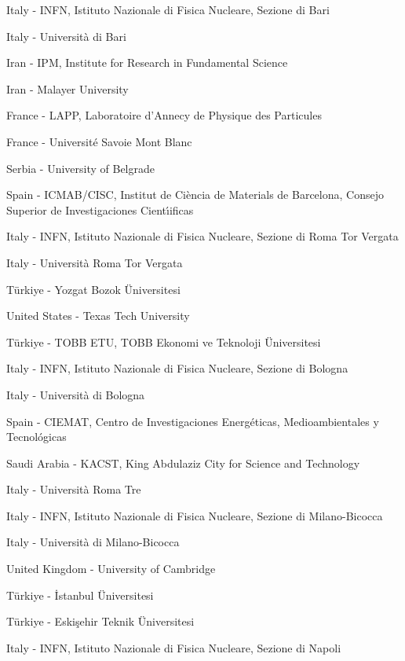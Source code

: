 \item[$^{23}$] Italy - INFN, Istituto Nazionale di Fisica Nucleare, Sezione di Bari
\item[$^{24}$] Italy - Universit{\`a} di Bari
\item[$^{25}$] Iran - IPM, Institute for Research in Fundamental Science
\item[$^{26}$] Iran - Malayer University
\item[$^{27}$] France - LAPP, Laboratoire d'Annecy de Physique des Particules
\item[$^{28}$] France - Universit{\'e} Savoie Mont Blanc
\item[$^{29}$] Serbia - University of Belgrade
\item[$^{30}$] Spain - ICMAB/CISC, Institut de Ci{\`e}ncia de Materials de Barcelona, Consejo Superior de Investigaciones Cient{\'\i}ificas
\item[$^{31}$] Italy - INFN, Istituto Nazionale di Fisica Nucleare, Sezione di Roma Tor Vergata
\item[$^{32}$] Italy - Universit{\`a} Roma Tor Vergata
\item[$^{33}$] T{\"u}rkiye - Yozgat Bozok {\"U}niversitesi
\item[$^{34}$] United States - Texas Tech University
\item[$^{35}$] T{\"u}rkiye - TOBB ETU, TOBB Ekonomi ve Teknoloji {\"U}niversitesi
\item[$^{36}$] Italy - INFN, Istituto Nazionale di Fisica Nucleare, Sezione di Bologna
\item[$^{37}$] Italy - Universit{\`a} di Bologna
\item[$^{38}$] Spain - CIEMAT, Centro de Investigaciones Energ{\'e}ticas, Medioambientales y Tecnol{\'o}gicas
\item[$^{39}$] Saudi Arabia - KACST, King Abdulaziz City for Science and Technology
\item[$^{40}$] Italy - Universit{\`a} Roma Tre
\item[$^{41}$] Italy - INFN, Istituto Nazionale di Fisica Nucleare, Sezione di Milano-Bicocca
\item[$^{42}$] Italy - Universit{\`a} di Milano-Bicocca
\item[$^{43}$] United Kingdom - University of Cambridge
\item[$^{44}$] T{\"u}rkiye - {\.{I}}stanbul {\"U}niversitesi
\item[$^{45}$] T{\"u}rkiye - Eski{\c s}ehir Teknik {\"U}niversitesi
\item[$^{46}$] Italy - INFN, Istituto Nazionale di Fisica Nucleare, Sezione di Napoli
